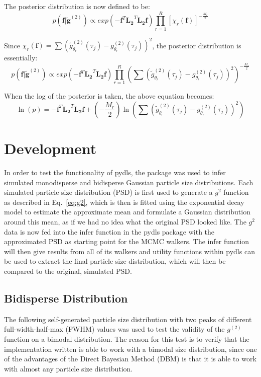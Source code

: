 \documentclass[11pt]{article}
\begin{document}
The posterior distribution is now defined to be:
\begin{equation}
p(\mathbf{f}|\tilde{\mathbf{g}}^{(2)}) \propto exp\left( -\mathbf{f}^T\mathbf{L_2}^T \mathbf{L_2}\mathbf{f}\right) \prod_{r=1}^{R} {\left[\chi_r(\mathbf{f})\right]}^{-\frac{M_r}{2}}
\end{equation}

Since $\chi_r(\mathbf{f}) = \sum {\left( \tilde{g}^{(2)}_{\theta_r} (\tau_j) - g^{(2)}_{\theta_r}(\tau_j) \right)}^2$, the posterior distribution is essentially:
\begin{equation}
p(\mathbf{f}|\tilde{\mathbf{g}}^{(2)}) \propto exp\left( -\mathbf{f}^T\mathbf{L_2}^T \mathbf{L_2}\mathbf{f}\right) \prod_{r=1}^{R} {\left( \sum{(\tilde{g}^{(2)}_{\theta_r} (\tau_j) - g^{(2)}_{\theta_r}(\tau_j) )}^2 \right)}^{-\frac{M_r}{2}}
\end{equation}

When the log of the posterior is taken, the above equation becomes:
\begin{equation}
\ln(p) = -\mathbf{f}^T\mathbf{L_2}^T \mathbf{L_2}\mathbf{f} + \left(-\frac{M_r}{2} \right) \ln \left(\sum {\left( \tilde{g}^{(2)}_{\theta_r} (\tau_j) - g^{(2)}_{\theta_r} (\tau_j) \right)}^2 \right)
\end{equation}


	
\section{Development}

In order to test the functionality of pydls, the package was used to infer simulated monodisperse and bidisperse Gaussian particle size distributions. Each simulated particle size distribution (PSD) is first used to generate a $g^2$ function as described in Eq.~\ref{eq:g2}, which is then is fitted using the exponential decay model to estimate the approximate mean and formulate a Gaussian distribution around this mean, as if we had no idea what the original PSD looked like. The $g^2$ data is now fed into the infer function in the pydls package with the approximated PSD as starting point for the MCMC walkers. The infer function will then give results from all of its walkers and utility functions within pydls can be used to extract the final particle size distribution, which will then be compared to the original, simulated PSD. 

\subsection{Bidisperse Distribution}
The following self-generated particle size distribution with two peaks of different full-width-half-max (FWHM) values was used to test the validity of the $g^{(2)}$ function on a bimodal distribution. The reason for this test is to verify that the implementation written is able to work with a bimodal size distribution, since one of the advantages of the Direct Bayesian Method (DBM) is that it is able to work with almost any particle size distribution. 
\end{document}
